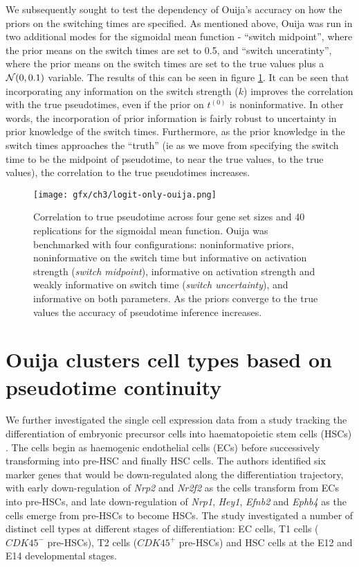 We subsequently sought to test the dependency of Ouija's accuracy on how the priors on the switching times are specified. As mentioned above, Ouija was run in two additional modes for the sigmoidal mean function - ``switch midpoint'', where the prior means on the switch times are set to 0.5, and ``switch unceratinty'', where the prior means on the switch times are set to the true values plus a $\mathcal{N}(0, 0.1)$ variable. The results of this can be seen in figure \ref{fig:ouija_only}. It can be seen that incorporating any information on the switch strength ($k$) improves the correlation with the true pseudotimes, even if the prior on $t^{(0)}$ is noninformative. In other words, the incorporation of prior information is fairly robust to uncertainty in prior knowledge of the switch times. Furthermore, as the prior knowledge in the switch times approaches the ``truth'' (ie as we move from specifying the switch time to be the midpoint of pseudotime, to near the true values, to the true values), the correlation to the true pseudotimes increases.


\begin{figure}%
	\centering
	\texttt{[image: gfx/ch3/logit-only-ouija.png]}
	\caption{Correlation to true pseudotime across four gene set sizes and 40 replications for the sigmoidal mean function. Ouija was benchmarked with four configurations: noninformative priors, noninformative on the switch time but informative on activation strength (\emph{switch midpoint}), informative on activation strength and weakly informative on switch time (\emph{switch uncertainty}), and informative on both parameters. As the priors converge to the true values the accuracy of pseudotime inference increases.}
	\label{fig:ouija_only}
\end{figure}


\section{Ouija clusters cell types based on pseudotime continuity}

We further investigated the single cell expression data from a study tracking the differentiation of embryonic precursor cells into haematopoietic stem cells (HSCs) \cite{zhou2016tracing}. The cells begin as haemogenic endothelial cells (ECs) before successively transforming  into pre-HSC and finally HSC cells. The authors identified six marker genes that would be down-regulated along the differentiation trajectory, with early down-regulation of \emph{Nrp2} and \emph{Nr2f2} as the cells transform from ECs into pre-HSCs, and late down-regulation of \emph{Nrp1}, \emph{Hey1}, \emph{Efnb2} and \emph{Ephb4} as the cells emerge from pre-HSCs to become HSCs. The study investigated a number of distinct cell types at different stages of differentiation: EC cells, T1 cells ($CDK45^-$ pre-HSCs), T2 cells ($CDK45^+$ pre-HSCs) and HSC cells at the E12 and E14 developmental stages.

